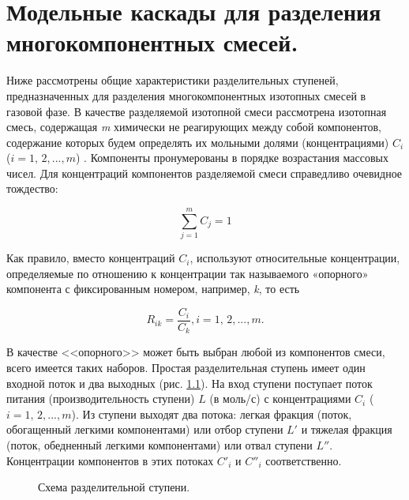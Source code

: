 \chapter{Модельные каскады для разделения многокомпонентных смесей.}



Ниже рассмотрены общие характеристики разделительных ступеней, предназначенных для разделения многокомпонентных изотопных смесей в газовой фазе. В качестве разделяемой изотопной смеси рассмотрена изотопная смесь, содержащая \textit{m} химически не реагирующих между собой компонентов, содержание которых будем определять их мольными долями (концентрациями) $C_{i}$ ($i=1,\, 2,...,m$) \cite{sulaberidzeTeoriyaKaskadovDlya2011}. Компоненты пронумерованы в порядке возрастания массовых чисел. Для концентраций компонентов разделяемой смеси справедливо очевидное тождество:

\begin{equation} \label{EQ__1_1_} 
  \sum _{j=1}^{m}C_{j}  =1 
\end{equation} 
  
Как правило, вместо концентраций $C_{i} $, используют относительные концентрации, определяемые по отношению к концентрации так называемого «опорного» компонента с фиксированным номером, например, \textit{k}, то есть

\begin{equation} \label{EQ__1_2_} 
  R_{ik} =\frac{C_{i} }{C_{k} } , i=1,\, 2,...,m.             
\end{equation} 
  
В качестве <<опорного>> может быть выбран любой из компонентов смеси, всего имеется   таких наборов. 
Простая разделительная ступень имеет один входной поток и два выходных (рис. \ref{1_1}). На вход ступени поступает поток питания (производительность ступени) $L$  (в моль/с) с концентрациями $C_{i}$ ($i=1,\, 2,...,m$). Из ступени выходят два потока: легкая фракция (поток, обогащенный легкими компонентами) или отбор ступени $L'$ и тяжелая фракция (поток, обедненный легкими компонентами) или отвал ступени $L''$. Концентрации компонентов в этих потоках  $C'_{i} $ и $C''_{i} $  соответственно.

\begin{figure}[ht]
  \caption{Схема разделительной ступени.}\label{1_1}
\end{figure}

